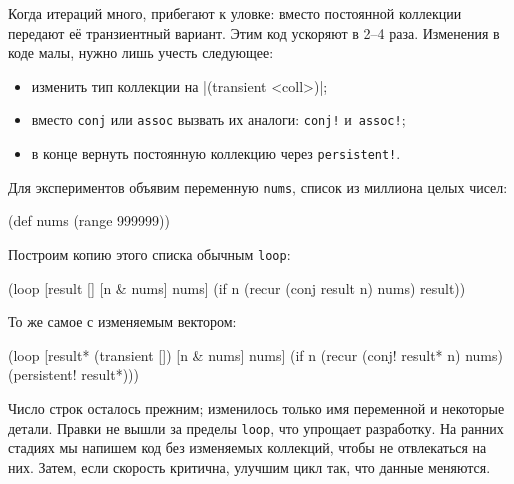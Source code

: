 Когда итераций много, прибегают к уловке: вместо постоянной коллекции передают
её транзиентный вариант. Этим код ускоряют в 2--4 раза. Изменения в коде малы,
нужно лишь учесть следующее:

\begin{itemize}

\item
  изменить тип коллекции на \spverb|(transient <coll>)|;

\item
  вместо \verb|conj| или \verb|assoc| вызвать их аналоги: \verb|conj!|
  и~\verb|assoc!|;

\item
  в конце вернуть постоянную коллекцию через \verb|persistent!|.

\end{itemize}

Для экспериментов объявим переменную \verb|nums|, список из миллиона целых
чисел:

\begin{english}
  \begin{clojure}
(def nums (range 999999))
  \end{clojure}
\end{english}


\noindent
Построим копию этого списка обычным \verb|loop|:

\begin{english}
  \begin{clojure}
(loop [result []
       [n & nums] nums]
  (if n
    (recur (conj result n) nums)
    result))
  \end{clojure}
\end{english}

\noindent
То же самое с изменяемым вектором:

\begin{english}
  \begin{clojure}
(loop [result* (transient [])
       [n & nums] nums]
  (if n
    (recur (conj! result* n) nums)
    (persistent! result*)))
  \end{clojure}
\end{english}

Число строк осталось прежним; изменилось только имя переменной и некоторые
детали. Правки не вышли за пределы \verb|loop|, что упрощает разработку. На
ранних стадиях мы напишем код без изменяемых коллекций, чтобы не отвлекаться на
них. Затем, если скорость критична, улучшим цикл так, что данные меняются.

